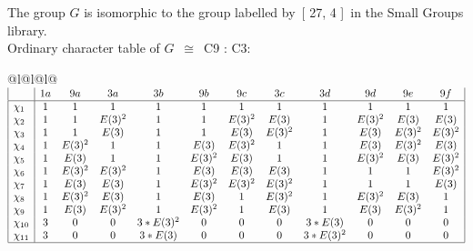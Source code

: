 \documentclass[varwidth=\maxdimen,border=10]{standalone}
\begin{document}
The group $G$ is isomorphic to the group labelled by\ [ 27, 4 ]\ in the Small Groups library.\\
Ordinary character table of $G$\ $\cong$\ C9 : C3:\\
\begin{center}
\begin{tabular}{@{}l@{}l@{}l@{}}
\hline
\(\begin{array}{|l|ccccccccccc|}
  & 1a & 9a & 3a & 3b & 9b & 9c & 3c & 3d & 9d & 9e & 9f\\ \hline
\chi_{1} & 1 & 1 & 1 & 1 & 1 & 1 & 1 & 1 & 1 & 1 & 1\\
\chi_{2} & 1 & 1 & E(3)^{2} & 1 & 1 & E(3)^{2} & E(3) & 1 & E(3)^{2} & E(3) & E(3)\\
\chi_{3} & 1 & 1 & E(3) & 1 & 1 & E(3) & E(3)^{2} & 1 & E(3) & E(3)^{2} & E(3)^{2}\\
\chi_{4} & 1 & E(3)^{2} & 1 & 1 & E(3) & E(3)^{2} & 1 & 1 & E(3) & E(3)^{2} & E(3)\\
\chi_{5} & 1 & E(3) & 1 & 1 & E(3)^{2} & E(3) & 1 & 1 & E(3)^{2} & E(3) & E(3)^{2}\\
\chi_{6} & 1 & E(3)^{2} & E(3)^{2} & 1 & E(3) & E(3) & E(3) & 1 & 1 & 1 & E(3)^{2}\\
\chi_{7} & 1 & E(3) & E(3) & 1 & E(3)^{2} & E(3)^{2} & E(3)^{2} & 1 & 1 & 1 & E(3)\\
\chi_{8} & 1 & E(3)^{2} & E(3) & 1 & E(3) & 1 & E(3)^{2} & 1 & E(3)^{2} & E(3) & 1\\
\chi_{9} & 1 & E(3) & E(3)^{2} & 1 & E(3)^{2} & 1 & E(3) & 1 & E(3) & E(3)^{2} & 1\\
\chi_{10} & 3 & 0 & 0 & 3*E(3)^{2} & 0 & 0 & 0 & 3*E(3) & 0 & 0 & 0\\
\chi_{11} & 3 & 0 & 0 & 3*E(3) & 0 & 0 & 0 & 3*E(3)^{2} & 0 & 0 & 0\\
\hline
\end{array}\)\\
\end{tabular}
\end{center}
\end{document}

